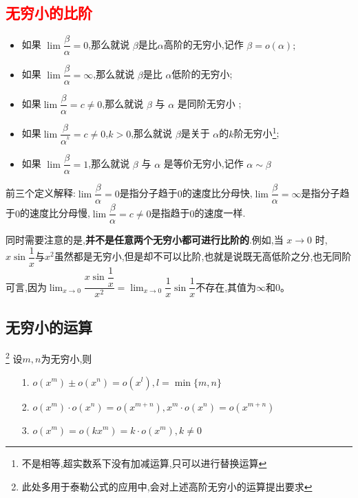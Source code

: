 \documentclass[10pt, a4paper, oneside, UTF8]{ctexbook}
\begin{document}
\begin{sloppypar}
    \subsection{\textcolor{red}{无穷小的比阶}}
    \begin{defn}{}{}
        \begin{itemize}
            \item 如果 $\lim \dfrac{\beta}{\alpha} =0$,那么就说 $\beta$是比$\alpha$高阶的无穷小,记作 $\beta=o(\alpha);$
            \item  如果 $\lim \dfrac\beta\alpha  =\infty$,那么就说 $\beta$是比 $\alpha$低阶的无穷小;
            \item 如果$\lim\dfrac{\beta}{\alpha} =c\neq 0$,那么就说 $\beta$ 与 $\alpha$ 是同阶无穷小 ;
            \item 如果$\lim\dfrac{\beta}{\alpha^{^k}} =c \neq 0$,$k > 0$,那么就说 $\beta$是关于 $\alpha$的$k$阶无穷小\footnote{不是相等,超实数系下没有加减运算,只可以进行替换运算};
            \item 如果 $\lim \dfrac\beta\alpha = 1$,那么就说 $\beta$ 与 $\alpha$ 是等价无穷小,记作 $\alpha\sim\beta$
        \end{itemize}
    \end{defn}
    前三个定义解释:$\lim \dfrac{\beta}{\alpha} =0$是指分子趋于$0$的速度比分母快,$\lim \dfrac\beta\alpha  =\infty$是指分子趋于$0$的速度比分母慢,$\lim\dfrac{\beta}{\alpha} =c\neq 0$是指趋于$0$的速度一样.

    同时需要注意的是,\textbf{并不是任意两个无穷小都可进行比阶的}.例如,当 $x\to 0$ 时,$x\sin\dfrac1x$与$x^2$虽然都是无穷小,但是却不可以比阶,也就是说既无高低阶之分,也无同阶可言,因为$\lim_{x \to 0}\dfrac{x \sin \dfrac{1}{x}}{x^2}=\lim_{x\to0}\dfrac1x\sin\dfrac1x$不存在,其值为$\infty$和$0$。
    \subsection{无穷小的运算}\footnote{此处多用于泰勒公式的应用中,会对上述高阶无穷小的运算提出要求}
    设$m,n$为无穷小,则
    \begin{itemize}
        \item[1.] $o(x^{m})\pm o(x^{n})=o(x^{l}),l=\min\{m,n\}$
        \item[2.] $o(x^{m})\cdot o(x^{n})=o(x^{m+n}),x^{m}\cdot o(x^{n})=o(x^{m+n})$
        \item[3.] $o(x^{m})=o(kx^{m})=k\cdot o(x^{m}),k \neq 0$
    \end{itemize}

\end{sloppypar}
\end{document}
